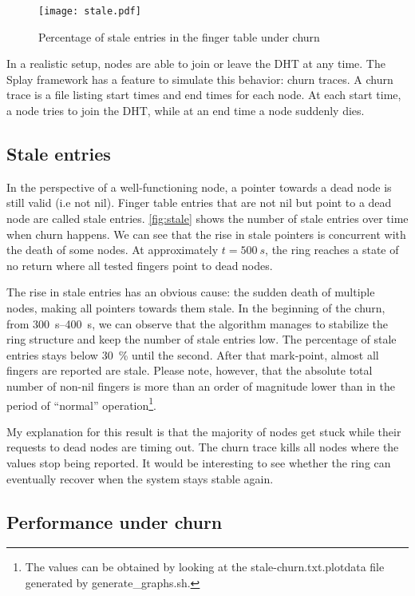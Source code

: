 \documentclass[11pt,a4paper,parskip=half]{scrartcl}
\begin{document}
\begin{figure}
	\centering
	\texttt{[image: stale.pdf]}
	\caption{Percentage of stale entries in the finger table under churn}
	\label{fig:stale}
\end{figure}

In a realistic setup, nodes are able to join or leave the DHT at any time.
The Splay framework has a feature to simulate this behavior: churn traces.
A churn trace is a file listing start times and end times for each node.
At each start time, a node tries to join the DHT, while at an end time a node suddenly dies.

\subsection{Stale entries}

In the perspective of a well-functioning node, a pointer towards a dead node is still valid (i.e not \textsf{nil}).
Finger table entries that are not \textsf{nil} but point to a dead node are called stale entries.
\autoref{fig:stale} shows the number of stale entries over time when churn happens.
We can see that the rise in stale pointers is concurrent with the death of some nodes.
At approximately $t=\SI{500}{s}$, the ring reaches a state of no return where all tested fingers point to dead nodes.

The rise in stale entries has an obvious cause: the sudden death of multiple nodes, making all pointers towards them stale.
In the beginning of the churn, from \SIrange{300}{400}{s}, we can observe that the algorithm manages to stabilize the ring structure and keep the number of stale entries low.
The percentage of stale entries stays below \SI{30}{\percent} until the  second.
After that mark-point, almost all fingers are reported are stale.
Please note, however, that the absolute total number of non-nil fingers is more than an order of magnitude lower than in the period of \enquote{normal} operation\footnote{The values can be obtained by looking at the \textsf{stale-churn.txt.plotdata} file generated by \textsf{generate\_graphs.sh}.}.

My explanation for this result is that the majority of nodes get stuck while their requests to dead nodes are timing out.
The churn trace kills all nodes where the values stop being reported.
It would be interesting to see whether the ring can eventually recover when the system stays stable again.

\subsection{Performance under churn}
\label{subsec:churn-perf}
\end{document}
